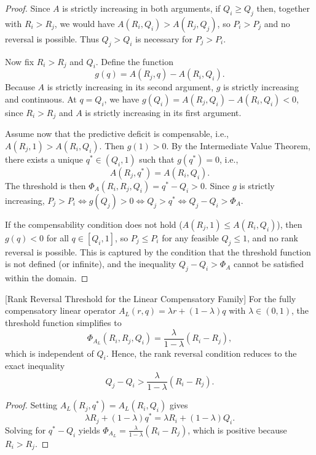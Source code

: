 \documentclass[mathematics,article,submit,moreauthors]{Definitions/mdpi}
\begin{document}
{\color{red}
\begin{proof}
Since $A$ is strictly increasing in both arguments, if $Q_i \ge Q_j$ then, together with $R_i>R_j$, we would have $A(R_i,Q_i) > A(R_j,Q_j)$, so $P_i>P_j$ and no reversal is possible. Thus $Q_j>Q_i$ is necessary for $P_j>P_i$.

Now fix $R_i>R_j$ and $Q_i$. Define the function
\[
g(q) = A(R_j, q) - A(R_i, Q_i).
\]
Because $A$ is strictly increasing in its second argument, $g$ is strictly increasing and continuous. At $q=Q_i$, we have $g(Q_i)=A(R_j,Q_i)-A(R_i,Q_i)<0$, since $R_i>R_j$ and $A$ is strictly increasing in its first argument.

Assume now that the predictive deficit is compensable, i.e., $A(R_j,1) > A(R_i,Q_i)$. Then $g(1) > 0$. By the Intermediate Value Theorem, there exists a unique $q^* \in (Q_i,1)$ such that $g(q^*)=0$, i.e.,
\[
A(R_j, q^*) = A(R_i, Q_i).
\]
The threshold is then $\Phi_A(R_i,R_j,Q_i)=q^*-Q_i>0$. Since $g$ is strictly increasing, $P_j>P_i \iff g(Q_j)>0 \iff Q_j > q^* \iff Q_j - Q_i > \Phi_A$.

If the compensability condition does not hold ($A(R_j,1) \le A(R_i,Q_i)$), then $g(q) < 0$ for all $q \in [Q_i,1]$, so $P_j \le P_i$ for any feasible $Q_j \le 1$, and no rank reversal is possible. This is captured by the condition that the threshold function is not defined (or infinite), and the inequality $Q_j - Q_i > \Phi_A$ cannot be satisfied within the domain.
\end{proof}
}

\begin{Corollary}{\color{red}[Rank Reversal Threshold for the Linear Compensatory Family]}
\label{cor:linear_reversal}
{\color{red}
For the fully compensatory linear operator $A_L(r,q)=\lambda r+(1-\lambda)q$ with $\lambda\in(0,1)$, the threshold function simplifies to
\[
\Phi_{A_L}(R_i,R_j,Q_i)=\frac{\lambda}{1-\lambda}(R_i-R_j),
\]
which is independent of $Q_i$. Hence, the rank reversal condition reduces to the exact inequality
\[
Q_j - Q_i > \frac{\lambda}{1-\lambda}(R_i - R_j).
\]
}
\end{Corollary}

{\color{red}
\begin{proof}
Setting $A_L(R_j, q^*) = A_L(R_i, Q_i)$ gives
\[
\lambda R_j + (1-\lambda) q^* = \lambda R_i + (1-\lambda) Q_i.
\]
Solving for $q^* - Q_i$ yields $\Phi_{A_L} = \frac{\lambda}{1-\lambda}(R_i-R_j)$, which is positive because $R_i>R_j$.
\end{proof}
}
\end{document}
